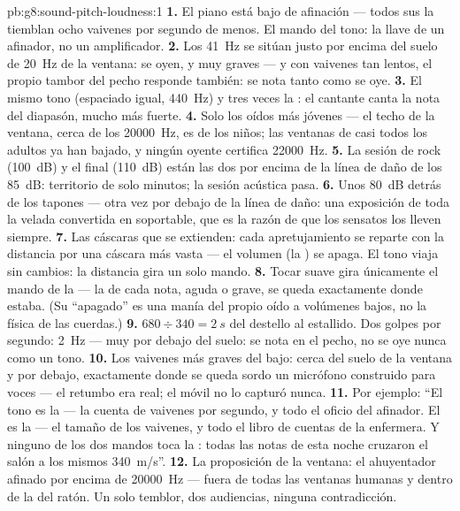\begin{solution}{pb:g8:sound-pitch-loudness:1}
\textbf{1.} El piano está bajo de afinación --- todos sus la tiemblan
ocho vaivenes por segundo de menos. El mando del tono: la llave de un
afinador, no un amplificador.
\textbf{2.} Los \qty{41}{Hz} se sitúan justo por encima del suelo de
\qty{20}{Hz} de la ventana: se oyen, y muy graves --- y con vaivenes
tan lentos, el propio tambor del pecho responde también: se nota tanto
como se oye.
\textbf{3.} El mismo tono (espaciado igual, \qty{440}{Hz}) y tres veces
la : el cantante canta la nota del diapasón, mucho más
fuerte.
\textbf{4.} Solo los oídos más jóvenes --- el techo de la ventana,
cerca de los \qty{20000}{Hz}, es de los niños; las ventanas de casi
todos los adultos ya han bajado, y ningún oyente certifica
\qty{22000}{Hz}.
\textbf{5.} La sesión de rock (\qty{100}{dB}) y el final
(\qty{110}{dB}) están las dos por encima de la línea de daño de los
\qty{85}{dB}: territorio de solo minutos; la sesión acústica pasa.
\textbf{6.} Unos \qty{80}{dB} detrás de los tapones --- otra vez por
debajo de la línea de daño: una exposición de toda la velada convertida
en soportable, que es la razón de que los sensatos los lleven siempre.
\textbf{7.} Las cáscaras que se extienden: cada apretujamiento se
reparte con la distancia por una cáscara más vasta --- el volumen (la
) se apaga. El tono viaja sin cambios: la distancia gira
un solo mando.
\textbf{8.} Tocar suave gira únicamente el mando de la
 --- la  de cada nota, aguda o
grave, se queda exactamente donde estaba. (Su ``apagado'' es una manía
del propio oído a volúmenes bajos, no la física de las cuerdas.)
\textbf{9.} $680 \div 340 = \qty{2}{s}$ del destello al estallido. Dos
golpes por segundo: \qty{2}{Hz} --- muy por debajo del suelo: se nota
en el pecho, no se oye nunca como un tono.
\textbf{10.} Los vaivenes más graves del bajo: cerca del suelo de la
ventana y por debajo, exactamente donde se queda sordo un micrófono
construido para voces --- el retumbo era real; el móvil no lo capturó
nunca.
\textbf{11.} Por ejemplo: ``El tono es la  --- la cuenta
de vaivenes por segundo, y todo el oficio del afinador. El  es
la  --- el tamaño de los vaivenes, y todo el libro de
cuentas de la enfermera. Y ninguno de los dos mandos toca la
: todas las notas de esta noche cruzaron el salón a los
mismos \qty{340}{m/s}''.
\textbf{12.} La proposición de la ventana: el ahuyentador afinado por
encima de \qty{20000}{Hz} --- fuera de todas las ventanas humanas y
dentro de la del ratón. Un solo temblor, dos audiencias, ninguna
contradicción.
\end{solution}
